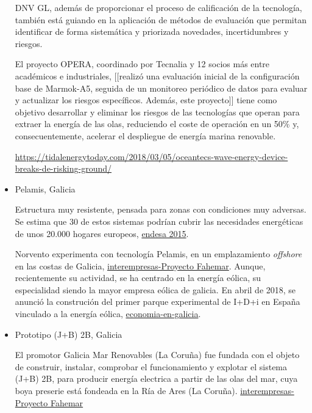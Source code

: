 \begin{itemize}
  DNV GL, además de proporcionar el proceso de calificación de la
  tecnología, también está guiando en la aplicación de métodos de
  evaluación que permitan identificar de forma sistemática y priorizada
  novedades, incertidumbres y riesgos.

  El proyecto OPERA, coordinado por Tecnalia y 12 socios más entre
  académicos e industriales, {[}{[}realizó una evaluación inicial de la
  configuración base de Marmok-A5, seguida de un monitoreo periódico de
  datos para evaluar y actualizar los riesgos específicos. Además, este
  proyecto{]}{]} tiene como objetivo desarrollar y eliminar los riesgos
  de las tecnologías que operan para extraer la energía de las olas,
  reduciendo el coste de operación en un 50\% y, consecuentemente,
  acelerar el despliegue de energía marina renovable.

  \url{https://tidalenergytoday.com/2018/03/05/oceantecs-wave-energy-device-breaks-de-risking-ground/}
\item
  Pelamis, Galicia

  Estructura muy resistente, pensada para zonas con condiciones muy
  adversas. Se estima que 30 de estos sistemas podrían cubrir las
  necesidades energéticas de unos 20.000 hogares europeos,
  \href{https://www.solucionesintegralesendesa.com/blog/equipamiento-hogar/ahorro-hogar/energia-undimotriz-el-poder-de-las-olas/}{endesa
  2015}.

  Norvento experimenta con tecnología Pelamis, en un emplazamiento
  \emph{offshore} en las costas de Galicia,
  \href{http://www.interempresas.net/Energia/Articulos/126331-Generar-energia-a-partir-de-energia-undimotriz.html}{interempresas-Proyecto
  Fahemar}. Aunque, recientemente su actividad, se ha centrado en la
  energía eólica, su especialidad siendo la mayor empresa eólica de
  galicia. En abril de 2018, se anunció la construción del primer parque
  experimental de I+D+i en España vinculado a la energía eólica,
  \href{http://www.economiaengalicia.com/articulo/empresa/norvento-construira-primer-parque-experimental-idi-espana-vinculado-energia-eolica/20170404180131003321.html}{economia-en-galicia}.


\item
  Prototipo (J+B) 2B, Galicia

  El promotor Galicia Mar Renovables (La Coruña) fue fundada con el
  objeto de construir, instalar, comprobar el funcionamiento y explotar
  el sistema (J+B) 2B, para producir energía electrica a partir de las
  olas del mar, cuya boya preserie está fondeada en la Ría de Ares (La
  Coruña).
  \href{http://www.interempresas.net/Energia/Articulos/126331-Generar-energia-a-partir-de-energia-undimotriz.html}{interempresas-Proyecto
  Fahemar}


\end{itemize}
